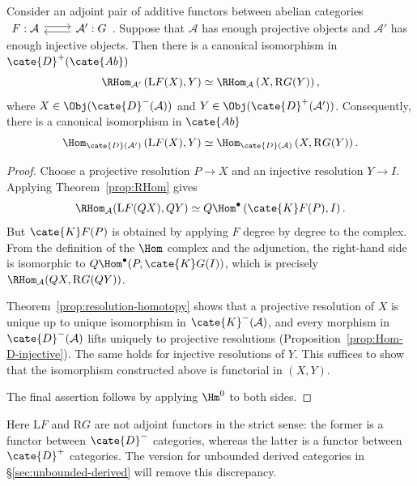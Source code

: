 \begin{theorem}\label{prop:RHom-adjoint-bounded}
	Consider an adjoint pair of additive functors between abelian categories
	$\begin{tikzcd}
		F: \mathcal{A} \arrow[r, shift left] & \mathcal{A}' \arrow[l, shift left] : G
	\end{tikzcd}$.
	Suppose that $\mathcal{A}$ has enough projective objects and
	$\mathcal{A}'$ has enough injective objects. Then there is a canonical
	isomorphism in $\cate{D}^+(\cate{Ab})$
	\[ \RHom_{\mathcal{A'}}\left(\mathrm{L}F(X), Y\right) \simeq \RHom_{\mathcal{A}}\left(X, \mathrm{R}G(Y) \right), \]
	where $X\in\Obj(\cate{D}^-(\mathcal{A}))$ and
	$Y\in\Obj(\cate{D}^+(\mathcal{A}'))$. Consequently, there is a canonical
	isomorphism in $\cate{Ab}$
	\[ \Hom_{\cate{D}(\mathcal{A'})}\left(\mathrm{L}F(X), Y\right) \simeq \Hom_{\cate{D}(\mathcal{A})}\left(X, \mathrm{R}G(Y) \right). \]
\end{theorem}
\begin{proof}
	Choose a projective resolution $P\to X$ and an injective resolution
	$Y\to I$. Applying Theorem~\ref{prop:RHom} gives
	\[ \RHom_{\mathcal{A}}(\mathrm{L}F(QX), QY) \simeq Q\Hom^\bullet\left( \cate{K}F(P), I \right). \]
	But $\cate{K}F(P)$ is obtained by applying $F$ degree by degree to the
	complex. From the definition of the $\Hom$ complex and the adjunction, the
	right-hand side is isomorphic to $Q\Hom^\bullet(P,\cate{K}G(I))$, which is
	precisely $\RHom_{\mathcal{A}}(QX,\mathrm{R}G(QY))$.

	Theorem~\ref{prop:resolution-homotopy} shows that a projective resolution of
	$X$ is unique up to unique isomorphism in $\cate{K}^-(\mathcal{A})$, and
	every morphism in $\cate{D}^-(\mathcal{A})$ lifts uniquely to projective
	resolutions (Proposition~\ref{prop:Hom-D-injective}). The same holds for
	injective resolutions of $Y$. This suffices to show that the isomorphism
	constructed above is functorial in $(X,Y)$.

	The final assertion follows by applying $\Hm^0$ to both sides.
\end{proof}

Here $\mathrm{L}F$ and $\mathrm{R}G$ are not adjoint functors in the strict
sense: the former is a functor between $\cate{D}^-$ categories, whereas the
latter is a functor between $\cate{D}^+$ categories. The version for unbounded
derived categories in \S\ref{sec:unbounded-derived} will remove this
discrepancy.
